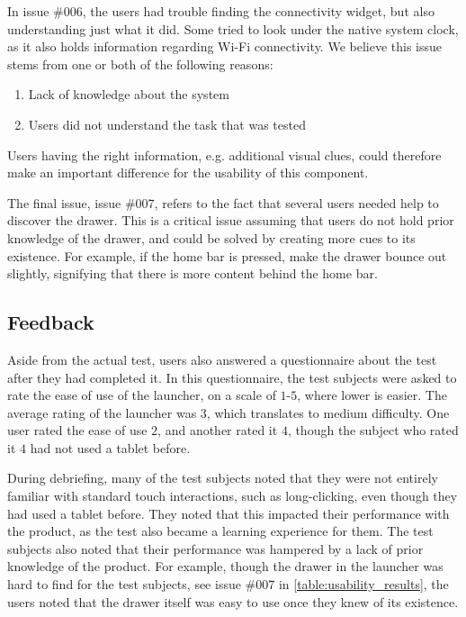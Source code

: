 In issue \#{}006, the users had trouble finding the connectivity widget, but also understanding just what it did. 
Some tried to look under the native system clock, as it also holds information regarding Wi-Fi connectivity. 
We believe this issue stems from one or both of the following reasons: 

\begin{enumerate}
	\item Lack of knowledge about the system
	\item Users did not understand the task that was tested
\end{enumerate}

Users having the right information, e.g. additional visual clues, could therefore make an important difference for the usability of this component. \newline

The final issue, issue \#{}007, refers to the fact that several users needed help to discover the drawer. 
This is a critical issue assuming that users do not hold prior knowledge of the drawer, and could be solved by creating more cues to its existence. 
For example, if the home bar is pressed, make the drawer bounce out slightly, signifying that there is more content behind the home bar. 

\subsection*{Feedback}
Aside from the actual test, users also answered a questionnaire about the test after they had completed it. 
In this questionnaire, the test subjects were asked to rate the ease of use of the launcher, on a scale of $1$-$5$, where lower is easier. 
The average rating of the launcher was $3$, which translates to medium difficulty. 
One user rated the ease of use $2$, and another rated it $4$, though the subject who rated it $4$ had not used a tablet before. \newline

During debriefing, many of the test subjects noted that they were not entirely familiar with standard touch interactions, such as long-clicking, even though they had used a tablet before. 
They noted that this impacted their performance with the product, as the test also became a learning experience for them. 
The test subjects also noted that their performance was hampered by a lack of prior knowledge of the product. 
For example, though the drawer in the \giraf[] launcher was hard to find for the test subjects, see issue \#{}007 in \autoref{table:usability_results}, the users noted that the drawer itself was easy to use once they knew of its existence. 